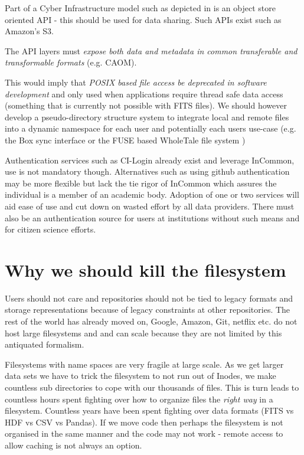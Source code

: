 Part of a Cyber Infrastructure model such as depicted in  is an object store oriented API - this should be used for data sharing. Such APIs exist such as Amazon's S3.

The  \gls{API} layers must \emph{expose both data and \gls{metadata} in common
transferable and transformable formats} (e.g. \gls{CAOM}).

This would imply that \emph{POSIX based file access be deprecated
in software development} and only used when applications require thread safe
data access (something that is currently not possible with \gls{FITS} files).
We should however  develop a pseudo-directory structure system to
integrate local and remote files into a dynamic namespace for each user and potentially
each users use-case (e.g. the Box sync interface or the \gls{FUSE} based WholeTale file system
\citep{BRINCKMAN2019854})

Authentication services such as CI-Login already exist and leverage InCommon, use is not mandatory though. Alternatives such as using github authentication may be more flexible but lack the tie rigor of InCommon which assures the individual is a member of an academic body.
Adoption of one or two services will  aid ease of use and cut down on wasted effort by all data providers.
There must also be an authentication source for users at institutions without such means and for citizen science efforts.

\section{Why we should kill the filesystem}

Users should not care and repositories should not be tied to legacy formats  and storage representations because of legacy constraints  at other repositories.
The rest of the world has already moved on,  Google, Amazon, Git, netflix etc. do not host large filesystems and and can scale because they are not limited by this antiquated formalism.


Filesystems with name spaces are very fragile at large scale. As we get larger data sets we have to trick the filesystem to not run out of Inodes, we make countless sub directories to cope with our thousands of files.
This is turn leads to countless hours spent fighting over how to organize files  the \emph{right way} in a filesystem.
Countless years have been spent fighting over data formats (\gls{FITS} vs \gls{HDF} vs \gls{CSV} vs Pandas).
If we move code then perhaps the filesystem is not organised in the same manner and the code may not work - remote access to allow caching is not always an option.

